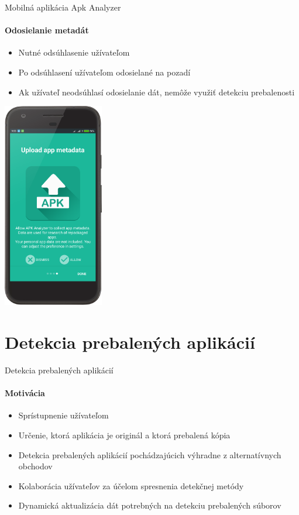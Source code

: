 \documentclass{beamer}
\begin{document}
 \begin{frame}[label=lists]{Mobilná aplikácia Apk Analyzer}
 	 \framesubtitle{Odosielanie metadát}
	\begin{minipage}[htb]{\textwidth}
		\begin{minipage}[t]{0.5\textwidth}
			\hbox{}
			\hbox{}
			\hbox{}
			\begin{itemize}
				\item Nutné odsúhlasenie užívateľom
				\item Po odsúhlasení užívateľom odosielané na pozadí	
				\item Ak užívateľ neodsúhlasí odosielanie dát, nemôže využiť detekciu prebalenosti	
			\end{itemize}
     		\vfill
		\end{minipage}%
	\hfill
	\centering
		\begin{minipage}[t][][b]{0.4\textwidth}
		\centering
		\includegraphics[height=9cm]{images/app/upload_device.png}
		\label{fig:app-detail}
		\end{minipage}%
	\end{minipage}
  \end{frame}    
   
 \section{Detekcia prebalených aplikácií}  
  \begin{frame}[label=lists]{Detekcia prebalených aplikácií}
 	 \framesubtitle{Motivácia}
		\begin{itemize}
			\item Sprístupnenie užívateľom
			\item Určenie, ktorá aplikácia je originál a ktorá prebalená kópia
			\item Detekcia prebalených aplikácií pochádzajúcich výhradne z alternatívnych obchodov
			\item Kolaborácia užívateľov za účelom spresnenia detekčnej metódy
			\item Dynamická aktualizácia dát potrebných na detekciu prebalených súborov
		\end{itemize}
  \end{frame}   
  
\end{document}
